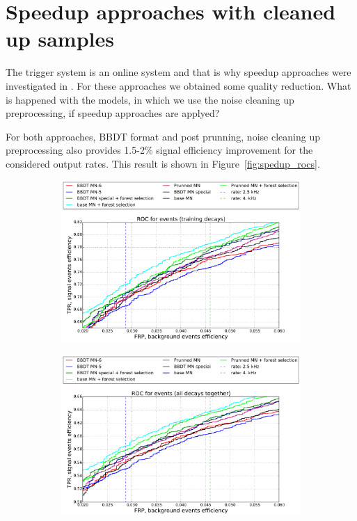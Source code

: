 \documentclass{llncs}
\begin{document}
\section{Speedup approaches with cleaned up samples}
The trigger system is an online system and that is why speedup approaches were investigated in \cite{run2_topo}. For these approaches we obtained some quality reduction. What is happened with the models, in which we use the noise cleaning up preprocessing, if speedup approaches are applyed?

For both approaches, BBDT format and post prunning, noise cleaning up preprocessing also provides 1.5-2\% signal efficiency improvement for the considered output rates. This result is shown in Figure~\ref{fig:spedup_rocs}.

\begin{figure}
	\begin{center}
    	\begin{subfigure}[b]{0.45\textwidth}
    		\includegraphics[width=\textwidth]{../../img/rocs_fast_training} \caption{}
    	\end{subfigure} %
    	\begin{subfigure}[b]{0.45\textwidth}
    		\includegraphics[width=\textwidth]{../../img/rocs_fast_all} \caption{} %

\end{subfigure}
\end{center}
\end{figure}
\end{document}
